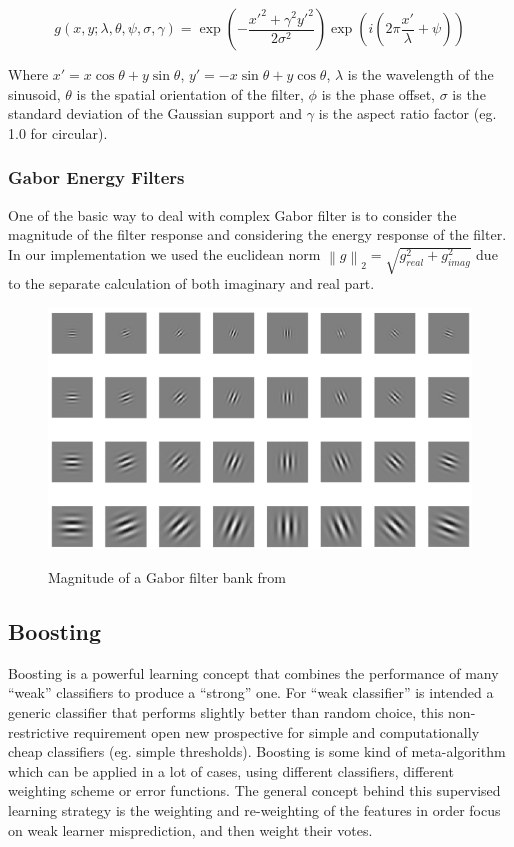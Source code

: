 \begin{equation}
g(x,y;\lambda,\theta,\psi,\sigma,\gamma) = \exp\left(-\frac{x'^2+\gamma^2y'^2}{2\sigma^2}\right)\exp\left(i\left(2\pi\frac{x'}{\lambda}+\psi\right)\right)
\end{equation}

Where $x' = x \cos\theta + y \sin\theta$, $y' = -x \sin\theta + y \cos\theta$, $\lambda$ is the wavelength of the sinusoid, $\theta$ is the spatial orientation of the filter, $\phi$ is the phase offset, $\sigma$ is the standard deviation of the Gaussian support and $\gamma$ is the aspect ratio factor (eg. 1.0 for circular).

\subsubsection*{Gabor Energy Filters}
One of the basic way to deal with complex Gabor filter is to consider the magnitude of the filter response and considering the energy response of the filter. In our implementation we used the euclidean norm $\left \| g \right \|_2 = \sqrt{ g_{real}^2+g_{imag}^2 }$ due to the separate calculation of both imaginary and real part.

\begin{figure}[!h]
\centering
\includegraphics[width=12cm]{images/gabor.png}
\label{fig:gabor}
\caption{Magnitude of a Gabor filter bank from \cite{gaborApplication} }
\end{figure}

\newpage
\subsection{Boosting}
\label{appr:boosting}

Boosting is a powerful learning concept that combines the performance of many ``weak'' classifiers to produce a ``strong'' one. For ``weak classifier'' is intended a generic classifier that performs slightly better than random choice, this non-restrictive requirement open new prospective for simple and computationally cheap classifiers (eg. simple thresholds). Boosting is some kind of meta-algorithm which can be applied in a lot of cases, using different classifiers, different weighting scheme or error functions. The general concept behind this supervised learning strategy is the weighting and re-weighting of the features in order focus on weak learner misprediction, and then weight their votes\cite{rojas2009adaboost}.\\

